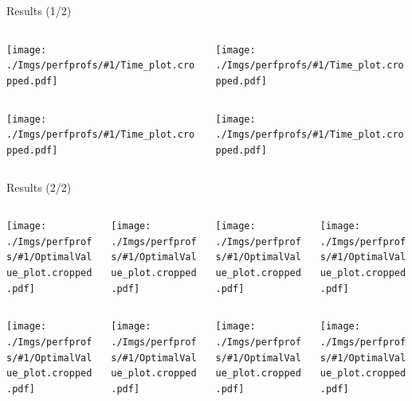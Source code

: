 \newcommand{\IncludeTimeProfile}[1]{
	\centering
	\texttt{[image: ./Imgs/perfprofs/\#1/Time\_plot.cropped.pdf]}
}

\newcommand{\IncludeDualBounds}[1]{
	\centering
	\texttt{[image: ./Imgs/perfprofs/\#1/OptimalValue\_plot.cropped.pdf]}
}

\begin{frame}{Results (1/2)}
	\begin{columns}
		\begin{column}{0.5\textwidth}
			\IncludeTimeProfile{E-scaled-1.0}
		\end{column}
		\begin{column}{0.5\textwidth}
			\IncludeTimeProfile{E-scaled-4.0}
		\end{column}
	\end{columns}
\end{frame}
\begin{frame}
	\begin{columns}
		\begin{column}{0.5\textwidth}
			\IncludeTimeProfile{E-scaled-8.0}
		\end{column}
		\begin{column}{0.5\textwidth}
			\IncludeTimeProfile{E-scaled-20.0}
		\end{column}
	\end{columns}
\end{frame}

\begin{frame}{Results (2/2)}
	\begin{columns}
		\begin{column}{0.2\textwidth}
			\IncludeDualBounds{E-scaled-1.0}
		\end{column}
		\begin{column}{0.2\textwidth}
			\IncludeDualBounds{E-scaled-4.0}
		\end{column}
		\begin{column}{0.2\textwidth}
			\IncludeDualBounds{E-scaled-8.0}
		\end{column}
		\begin{column}{0.2\textwidth}
			\IncludeDualBounds{E-scaled-20.0}
		\end{column}
	\end{columns}
	\begin{columns}
		\begin{column}{0.2\textwidth}
			\IncludeDualBounds{F-scaled-1.0}
		\end{column}
		\begin{column}{0.2\textwidth}
			\IncludeDualBounds{F-scaled-4.0}
		\end{column}
		\begin{column}{0.2\textwidth}
			\IncludeDualBounds{F-scaled-8.0}
		\end{column}
		\begin{column}{0.2\textwidth}
			\IncludeDualBounds{F-scaled-20.0}
		\end{column}
	\end{columns}

\end{frame}

